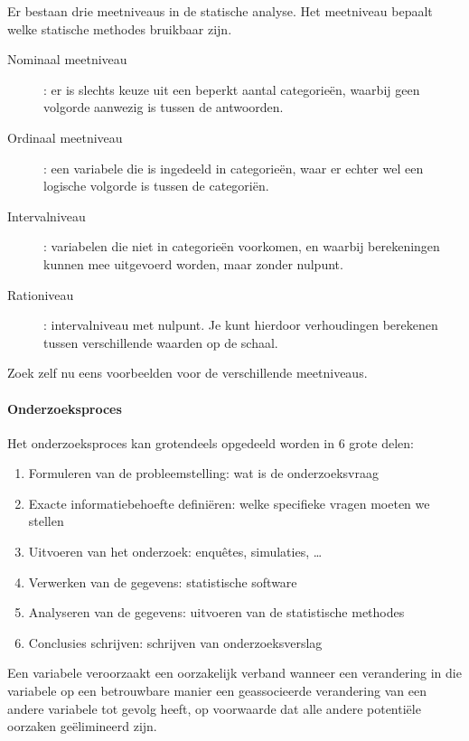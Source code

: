 Er bestaan drie meetniveaus in de statische analyse. Het meetniveau bepaalt welke statische methodes bruikbaar zijn. 
\begin{description}
	\item [Nominaal meetniveau] : er is slechts keuze uit een beperkt aantal categorie\"en, waarbij geen volgorde aanwezig is tussen de antwoorden.
	\item [Ordinaal meetniveau] : een variabele die is ingedeeld in categorie\"en, waar er echter wel een logische volgorde is tussen de categori\"en. 
	\item [Intervalniveau] : variabelen die niet in categorie\"en voorkomen, en waarbij berekeningen kunnen mee uitgevoerd worden, maar zonder nulpunt.
	\item [Rationiveau] : intervalniveau met nulpunt. Je kunt hierdoor verhoudingen berekenen tussen verschillende waarden op de schaal.
\end{description}

\begin{exercise}
	Zoek zelf nu eens voorbeelden voor de verschillende meetniveaus.
\end{exercise}

\paragraph{Onderzoeksproces}
Het onderzoeksproces kan grotendeels opgedeeld worden in 6 grote delen:
\begin{enumerate}
	\item Formuleren van de probleemstelling: wat is de onderzoeksvraag
	\item Exacte informatiebehoefte defini\"eren: welke specifieke vragen moeten we stellen
	\item Uitvoeren van het onderzoek: enqu\^etes, simulaties, \dots
	\item Verwerken van de gegevens: statistische software
	\item Analyseren van de gegevens: uitvoeren van de statistische methodes
	\item Conclusies schrijven: schrijven van onderzoeksverslag
\end{enumerate}

\begin{definition}
 Een variabele veroorzaakt een oorzakelijk verband wanneer een verandering in die variabele op een betrouwbare manier een geassocieerde verandering van een andere variabele tot gevolg heeft, op voorwaarde dat alle andere potenti\"ele oorzaken ge\"elimineerd zijn.
\end{definition}

